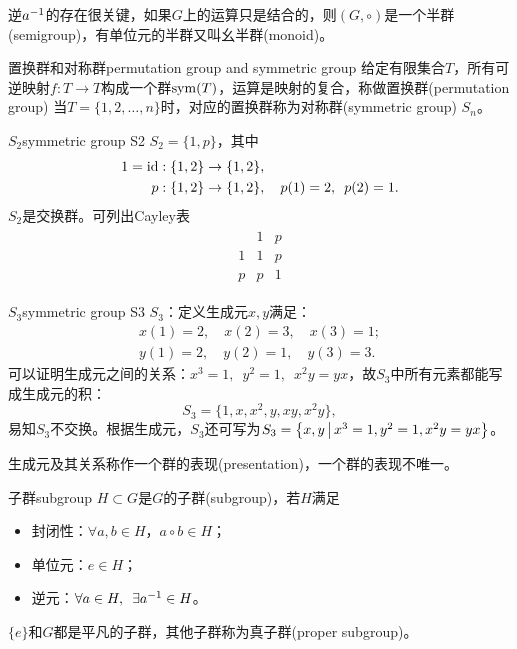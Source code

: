 \begin{remark}
	逆$a^{-1}$的存在很关键，如果$G$上的运算只是结合的，则$(G,\circ)$是一个半群(semigroup)，有单位元的半群又叫幺半群(monoid)。
\end{remark}
\begin{definition}{置换群和对称群}{permutation group and symmetric group}
	给定有限集合$T$，所有可逆映射$f:T\to T$构成一个群$\operatorname{sym}(T)$，运算是映射的复合，称做置换群(permutation group)
	\tcblower
	当$T=\{1,2,\ldots,n\}$时，对应的置换群称为对称群(symmetric group) $S_n$。
\end{definition}
\begin{example}{$S_2$}{symmetric group S2}
	$S_2=\{1,p\}$，其中 
		\begin{align*}
			1=\operatorname{id}:\{1,2\}\to\{1,2\}&,\\
			p:\{1,2\}\to\{1,2\}&,\quad p(1)=2,\enspace p(2)=1.
		\end{align*}
		$S_2$是交换群。可列出Cayley表
		\begin{align*}
			\begin{array}{c|cc}
				&1&p\\
				\hline
				1&1&p\\
				p&p&1
			\end{array}
		\end{align*}
\end{example}
\begin{example}{$S_3$}{symmetric group S3}
	$S_3$：定义生成元$x,y$满足：
	\begin{align*}
		x(1)=2,\quad x(2)=3,\quad x(3)=1;\\
		y(1)=2,\quad y(2)=1,\quad y(3)=3.
	\end{align*}
	可以证明生成元之间的关系：$x^3=1,\enspace y^2=1,\enspace x^2y=yx$，故$S_3$中所有元素都能写成生成元的积：
	\[
		S_3=\{1,x,x^2,y,xy,x^2y\},
	\]
	易知$S_3$不交换。根据生成元，$S_3$还可写为$S_3=\left\{x,y\,\middle\vert\,x^3=1,y^2=1,x^2y=yx\right\}$。
	
	生成元及其关系称作一个群的表现(presentation)，一个群的表现不唯一。
\end{example}
\begin{definition}{子群}{subgroup}
	$H\subset G$是$G$的子群(subgroup)，若$H$满足
	\begin{itemize}
		\item 封闭性：$\forall a,b\in H$，$a\circ b\in H$；
		\item 单位元：$e\in H$；
		\item 逆元：$\forall a\in H,\enspace\exists a^{-1}\in H$。
	\end{itemize}
	$\{e\}$和$G$都是平凡的子群，其他子群称为真子群(proper subgroup)。
\end{definition}

